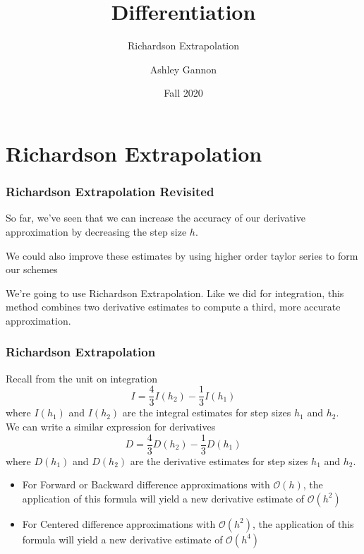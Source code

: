 \documentclass{if-beamer}
\title[Lecture 26]{Differentiation}
\subtitle{Richardson Extrapolation}
\author{Ashley Gannon}
\date{Fall 2020}
\begin{document}
\begin{frame}
  \titlepage
\end{frame}
\section{Richardson Extrapolation}

\begin{frame}
	\frametitle{Richardson Extrapolation Revisited}
	
	So far, we've seen that we can increase the accuracy of our derivative approximation by decreasing the step size $h$.\\\vspace{1cm}
	
	We could also improve these estimates by using higher order taylor series to form our schemes\\\vspace{1cm}
	
	We're going to use Richardson Extrapolation. Like we did for integration, this method combines two derivative estimates to compute a third, more accurate approximation.
	
\end{frame}


\begin{frame}
	\frametitle{Richardson Extrapolation}
	Recall from the unit on integration
	$$I = \frac{4}{3}I(h_2)-\frac{1}{3}I(h_1)$$
	where $I(h_1)$ and $I(h_2)$ are the integral estimates for step sizes $h_1$ and $h_2$. \\\vspace{1cm}
	We can write a similar expression for derivatives
	$$ D = \frac{4}{3}D(h_2)-\frac{1}{3}D(h_1) $$
	where $D(h_1)$ and $D(h_2)$ are the derivative estimates for step sizes $h_1$ and $h_2$.
	\begin{itemize}
		\item For Forward or Backward difference approximations with $\mathcal{O}(h)$, the application of this formula will yield a new derivative estimate of $\mathcal{O}(h^2)$
		\item For Centered difference approximations with $\mathcal{O}(h^2)$, the application of this formula will yield a new derivative estimate of $\mathcal{O}(h^4)$
	\end{itemize}
	
\end{frame}
\end{document}
